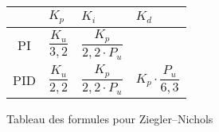 \def\tabularxcolumn#1{m{#1}}
\begin{figure}[ht]
	\begin{center}
		\begin{tabularx}{\textwidth}{| c | X | X | X |}
			\hline
			& $K_p$ & $K_i$ & $K_d$\\ \hline
			PI & \begin{equation*}\frac{K_u}{3,2}\end{equation*} & \begin{equation*}\frac{K_p}{2,2 \cdot P_u}\end{equation*} &\\ \hline
			PID & \begin{equation*}\frac{K_u}{2,2}\end{equation*} & \begin{equation*}\frac{K_p}{2,2 \cdot P_u}\end{equation*} & \begin{equation*}K_p \cdot \frac{P_u}{6,3}\end{equation*} \\
			\hline
		\end{tabularx}
	\end{center}
	\caption{Tableau des formules pour Ziegler–Nichols}
	\label{tab:ZieglerNicholsTuningFormulas}
\end{figure}
